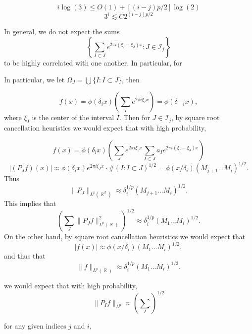 \documentclass[dvipsnames,letterpaper,12pt]{article}
\numberwithin{equation}{section}
\DeclareMathOperator{\RR}{\mathbb{R}}
\numberwithin{theorem}{section}
\begin{document}
\[ i \log(3) \leq O(1) + [(i-j) p / 2] \log(2) \]
\[ 3^i \lesssim C 2^{(i-j)p/2} \]

In general, we do not expect the sums
%
\[ \left\{ \sum_{I \subset J} e^{2 \pi i (\xi_I - \xi_J) x} : J \in \mathcal{I}_j \right\} \]
%
to be highly correlated with one another. In particular, for 

In particular, we let $\Omega_J = \bigcup \{ I : I \subset J \}$, then



%
\[ f(x) = \phi(\delta_i x) \left( \sum_I e^{2 \pi i \xi_I x} \right) = \phi(\delta-_i x), \]
%
where $\xi_I$ is the center of the interval $I$. Then for $J \in \mathcal{I}_j$, by square root cancellation heuristics we would expect that with high probability,

\[ f(x) = \phi(\delta_i x) \left( \sum_J e^{2 \pi i \xi_J x} \sum_{I \subset J} a_I e^{2 \pi i (\xi_I - \xi_J) x} \right) \]
%
\[ |(P_J f)(x)| \approx \phi(\delta_i x) e^{2 \pi i \xi_J x} \cdot \#( I : I \subset J)^{1/2} = \phi(x/\delta_i) (M_{j+1} \dots M_i)^{1/2}. \]
%
Thus
%
\[ \| P_J \|_{L^p(\RR^d)} \approx \delta_i^{1/p} (M_{j+1} \dots M_i)^{1/2}. \]
%
This implies that
%
\[ \left( \sum_J \| P_J f \|_{L^p(\RR)}^2 \right)^{1/2} \approx \delta_i^{1/p} (M_1 \dots M_i)^{1/2}. \]
%
On the other hand, by square root cancellation heuristics we would expect that
%
\[ |f(x)| \approx \phi(x/\delta_i) (M_1 \dots M_i)^{1/2}, \]
%
and thus that
%
\[ \| f \|_{L^p(\RR)} \approx \delta_i^{1/p} (M_1 \dots M_i)^{1/2}. \]

we would expect that with high probability,
%
\[ \| P_I f \|_{L^p} \approx \left( \sum_I \right)^{1/2} \]

for any given indices $j$ and $i$,
\end{document}

